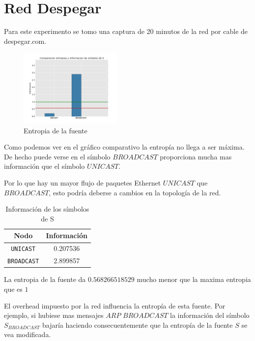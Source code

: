 \section{Red Despegar}

Para este experimento se tomo una captura de 20 minutos de la red por cable de despegar.com.

\begin{figure}[h]
  \centering
    \includegraphics[width=0.45\textwidth]{entropia_red_despegar_s.png}
  \caption{Entropia de la fuente}
  \label{entropia-s}
\end{figure}

Como podemos ver en el gráfico comparativo la entropía no llega a ser máxima. De hecho puede verse en el símbolo $BROADCAST$ proporciona mucha mas información que el símbolo $UNICAST$. 

Por lo que hay un mayor flujo de paquetes Ethernet $UNICAST$ que $BROADCAST$, esto podría deberse a cambios en la topología de la red.


    \begin{table}[ht]\begin{center}
      \begin{tabular}{|c|c|}
      \hline
      \textbf{Nodo} & \textbf{Información} \\ \hline
      \texttt{UNICAST}& 0.207536 \\ \hline
      \texttt{BROADCAST}& 2.899857 \\ \hline
      \end{tabular}
      \caption{Información de los símbolos de S}
      \label{info-simbolos}
    \end{center}\end{table}

La entropia de la fuente da $0.568266518529$ mucho  menor que la maxima entropia que es $1$

El overhead impuesto por la red influencia la entropía de esta fuente.
Por ejemplo, si hubiese mas mensajes $ARP$ $BROADCAST$ la información del símbolo $S_{BROADCAST}$ bajaría haciendo consecuentemente que la entropía de la fuente $S$ se vea modificada.


